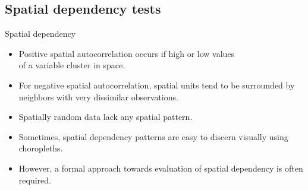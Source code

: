 \documentclass{beamer}
\begin{document}
\subsection{Spatial dependency tests}
\begin{frame}{Spatial dependency}
\begin{itemize}
    \item Positive spatial autocorrelation occurs if high or low values \\of a variable cluster in space. \medskip
    \item For negative spatial autocorrelation, spatial units tend to be surrounded by neighbors with very dissimilar observations. 
    \medskip
    \item Spatially random data lack any spatial pattern.
    \medskip
    \item Sometimes, spatial dependency patterns are easy to discern visually using choropleths. 
    \medskip
    \item However, a formal approach towards evaluation of spatial dependency is often required.
\end{itemize}
\end{frame}
\end{document}
